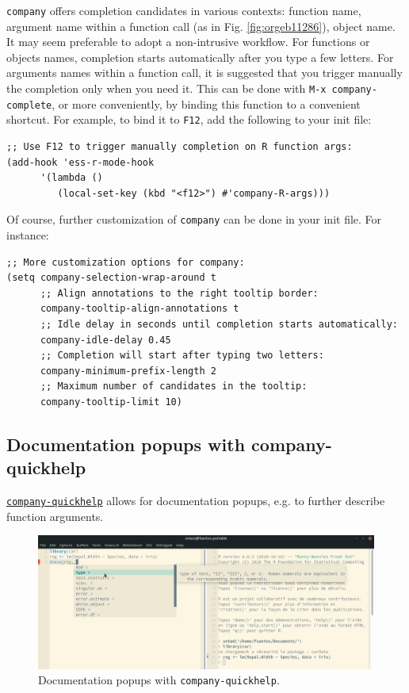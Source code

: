 \documentclass[11pt]{article}
\begin{document}
\texttt{company} offers completion candidates in various contexts: function name, argument name within a function call (as in Fig. \ref{fig:orgeb11286}), object name. It may seem preferable to adopt a non-intrusive workflow. For functions or objects names, completion starts automatically after you type a few letters. For arguments names within a function call, it is suggested that you trigger manually the completion only when you need it. This can be done with \texttt{M-x company-complete}, or more conveniently, by binding this function to a convenient shortcut. For example, to bind it to \texttt{F12}, add the following to your init file:

\begin{verbatim}
;; Use F12 to trigger manually completion on R function args:
(add-hook 'ess-r-mode-hook
	  '(lambda ()
	     (local-set-key (kbd "<f12>") #'company-R-args)))
\end{verbatim}

\pagebreak

Of course, further customization of \texttt{company} can be done in your init file. For instance:

\begin{verbatim}
;; More customization options for company:
(setq company-selection-wrap-around t
      ;; Align annotations to the right tooltip border:
      company-tooltip-align-annotations t
      ;; Idle delay in seconds until completion starts automatically:
      company-idle-delay 0.45
      ;; Completion will start after typing two letters:
      company-minimum-prefix-length 2
      ;; Maximum number of candidates in the tooltip:
      company-tooltip-limit 10)
\end{verbatim}

\subsection{Documentation popups with company-quickhelp}
\label{sec:org5777fd6}
\href{https://github.com/company-mode/company-quickhelp}{\texttt{company-quickhelp}} allows for documentation popups, e.g. to further describe function arguments.

\begin{figure}[htbp]
\centering
\includegraphics[width=\textwidth]{./images/company-quickhelp.png}
\caption{Documentation popups with \texttt{company-quickhelp}.}
\end{figure}
\end{document}
